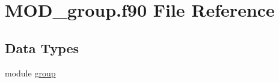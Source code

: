 \hypertarget{MOD__group_8f90}{\section{M\-O\-D\-\_\-group.\-f90 File Reference}
\label{MOD__group_8f90}
}
\subsection*{Data Types}
\begin{DoxyCompactItemize}
\item 
module \hyperlink{classgroup}{group}
\end{DoxyCompactItemize}
